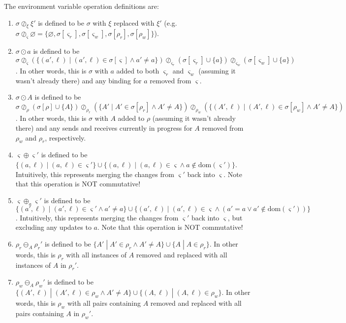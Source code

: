 \documentclass[times,10pt]{article}
\begin{document}
The environment variable operation definitions are:
\begin{enumerate}
    \item $\sigma \oslash_\xi \xi'$ is defined to be $\sigma$ with $\xi$ replaced with $\xi'$ (e.g. $\sigma \oslash_\varsigma \varnothing = \{\varnothing, \sigma[\varsigma_r], \sigma[\varsigma_w], \sigma[\rho_r], \sigma[\rho_w]\}$).
    \item $\sigma \odot a$ is defined to be $\sigma \oslash_\varsigma (\{(a', \ell) \; | \; (a', \ell) \in \sigma[\varsigma] \wedge a' \neq a\}) \oslash_{\varsigma_r} (\sigma[\varsigma_r] \cup \{a\}) \oslash_{\varsigma_w} (\sigma[\varsigma_w] \cup \{a\})$.
        In other words, this is $\sigma$ with $a$ added to both $\varsigma_r$ and $\varsigma_w$ (assuming it wasn't already there) and any binding for $a$ removed from $\varsigma$.
    \item $\sigma \odot A$ is defined to be $\sigma \oslash_\rho (\sigma[\rho] \cup \{A\}) \oslash_{\rho_r} (\{A' \; | \; A' \in \sigma[\rho_r] \wedge A' \neq A\}) \oslash_{\rho_w} (\{(A', \ell) \; | \; (A', \ell) \in \sigma[\rho_w] \wedge A' \neq A\})$.
        In other words, this is $\sigma$ with $A$ added to $\rho$ (assuming it wasn't already there) and any sends and receives currently in progress for $A$ removed from $\rho_w$ and $\rho_r$, respectively.
    \item $\varsigma \oplus \varsigma'$ is defined to be $\{(a, \ell) \; | \; (a, \ell) \in \varsigma'\} \cup \{(a, \ell) \; | \; (a, \ell) \in \varsigma \wedge a \notin \mathrm{dom}(\varsigma')\}$.
        Intuitively, this represents merging the changes from $\varsigma'$ back into $\varsigma$. Note that this operation is NOT commutative!
    \item $\varsigma \oplus_a \varsigma'$ is defined to be $\{(a', \ell) \; | \; (a', \ell) \in \varsigma' \wedge a' \neq a\} \cup \{(a', \ell) \; | \; (a', \ell) \in \varsigma \wedge (a' = a \vee a' \notin \mathrm{dom}(\varsigma'))\}$.
        Intuitively, this represents merging the changes from $\varsigma'$ back into $\varsigma$, but excluding any updates to $a$. Note that this operation is NOT commutative!
    \item $\rho_r \ominus_A \rho_r'$ is defined to be $\{A' \; | \; A' \in \rho_r \wedge A' \neq A\} \cup \{A \; | \; A \in \rho_r\}$. In other words, this is $\rho_r$ with all instances of $A$ removed and replaced with all instances of $A$ in $\rho_r'$.
    \item $\rho_w \ominus_A \rho_w'$ is defined to be $\{(A', \ell) \; | \; (A', \ell) \in \rho_w \wedge A' \neq A\} \cup \{(A, \ell) \; | \; (A, \ell) \in \rho_w\}$. In other words, this is $\rho_w$ with all pairs containing $A$ removed and replaced with all pairs containing $A$ in $\rho_w'$.

\end{enumerate}
\end{document}
